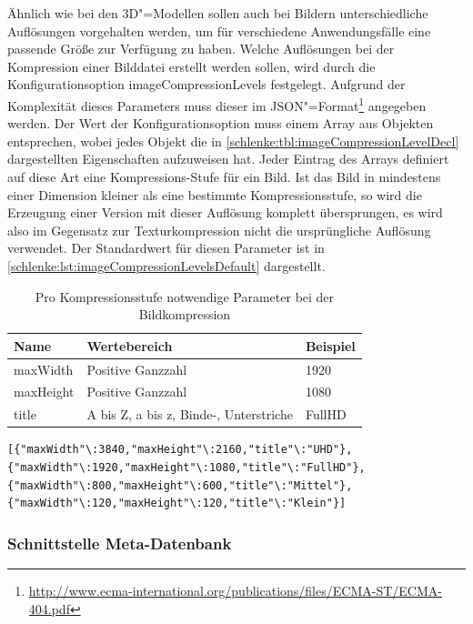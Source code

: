 Ähnlich wie bei den 3D"=Modellen sollen auch bei Bildern unterschiedliche Auflösungen vorgehalten werden, um für verschiedene Anwendungsfälle eine passende Größe zur Verfügung zu haben. Welche Auflösungen bei der Kompression einer Bilddatei erstellt werden sollen, wird durch die Konfigurationsoption {\ttfamily image\-Compression\-Levels} festgelegt. Aufgrund der Komplexität dieses Parameters muss dieser im JSON"=Format\footnote{\url{http://www.ecma-international.org/publications/files/ECMA-ST/ECMA-404.pdf}} angegeben werden. Der Wert der Konfigurationsoption muss einem Array aus Objekten entsprechen, wobei jedes Objekt die in \autoref{schlenke:tbl:imageCompressionLevelDecl} dargestellten Eigenschaften aufzuweisen hat. Jeder Eintrag des Arrays definiert auf diese Art eine Kompressions-Stufe für ein Bild. Ist das Bild in mindestens einer Dimension kleiner als eine bestimmte Kompressionsstufe, so wird die Erzeugung einer Version mit dieser Auflösung komplett übersprungen, es wird also im Gegensatz zur Texturkompression nicht die ursprüngliche Auflösung verwendet. Der Standardwert für diesen Parameter ist in \autoref{schlenke:lst:imageCompressionLevelsDefault} dargestellt.

\begin{table}
\begin{center}
\begin{tabular}{lll}
Name & Wertebereich & Beispiel \\
\hline
maxWidth & Positive Ganzzahl & 1920 \\
maxHeight & Positive Ganzzahl & 1080 \\
title & A bis Z, a bis z, Binde-, Unterstriche & \glqq{}FullHD\grqq{} \\
\end{tabular}
\caption{Pro Kompressionsstufe notwendige Parameter bei der Bildkompression}
\label{schlenke:tbl:imageCompressionLevelDecl}
\end{center}
\end{table}

\begin{lstlisting}[caption={Standardwert für die Konfigurationsoption {\ttfamily image\-Compression\-Levels}},label=schlenke:lst:imageCompressionLevelsDefault]
	[{"maxWidth"\:3840,"maxHeight"\:2160,"title"\:"UHD"}, {"maxWidth"\:1920,"maxHeight"\:1080,"title"\:"FullHD"}, {"maxWidth"\:800,"maxHeight"\:600,"title"\:"Mittel"}, {"maxWidth"\:120,"maxHeight"\:120,"title"\:"Klein"}]
\end{lstlisting}

\subsubsection{Schnittstelle Meta-Datenbank}


